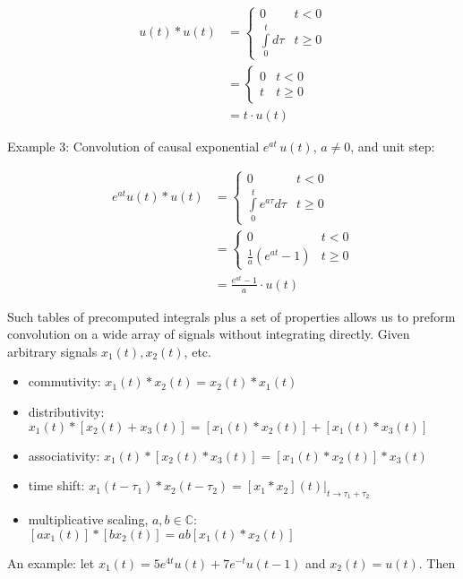 \documentclass{article}
\begin{document}
\begin{align}
u(t) * u(t) &= \left\{\begin{array}{cc}
  0 & t < 0\\
  \int\limits_{0}^{t} d\tau & t \geq 0
\end{array}\right.\\
&= \left\{\begin{array}{cc}
  0 & t < 0\\
  t & t \geq 0
\end{array}\right.\\
&= t\cdot u(t)
\end{align}

Example 3: Convolution of causal exponential $e^{a t}\, u(t)$, $a \neq 0$, and unit step:

\begin{align}
e^{a t}u(t) * u(t) &= \left\{\begin{array}{cc}
  0 & t < 0\\
  \int\limits_{0}^{t} e^{a \tau}d\tau & t \geq 0
\end{array}\right.\\
&= \left\{\begin{array}{cc}
  0 & t < 0\\
  \frac{1}{a}\left(e^{at} - 1\right)  & t \geq 0
\end{array}\right.\\
&= \frac{e^{at} - 1}{a}\cdot u(t)
\end{align}

Such tables of precomputed integrals plus a set of properties allows us to preform convolution on a wide array of signals without integrating directly. Given arbitrary signals $x_1(t), x_2(t)$, etc.

\begin{itemize}
\item commutivity: $x_1(t) * x_2(t) = x_2(t) * x_1(t)$
\item distributivity: $x_1(t) * [x_2(t) + x_3(t)] = [x_1(t)*x_2(t)] + [x_1(t)*x_3(t)]$
\item associativity: $x_1(t) * [x_2(t) * x_3(t)] = [x_1(t)*x_2(t)] * x_3(t)$
\item time shift: $x_1(t-\tau_1)*x_2(t-\tau_2) = \left. [x_1 * x_2](t) \right|_{t\rightarrow \tau_1 + \tau_2}$
\item multiplicative scaling, $a,b\in\mathbb{C}$: $[ax_1(t)]*[bx_2(t)] = ab[x_1(t) * x_2(t)]$ 
\end{itemize}

An example: let $x_1(t) = 5e^{4t}u(t) + 7e^{-t}u(t-1)$ and $x_2(t) = u(t)$. Then
\end{document}
